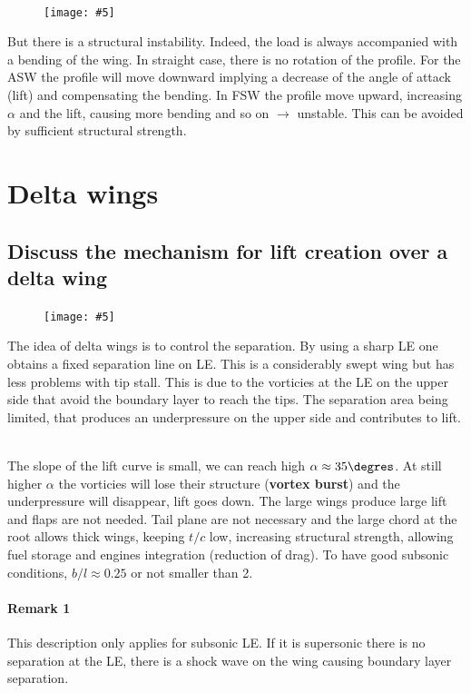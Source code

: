 \documentclass[british,french,11pt, a4paper, openany]{article}
\newcommand{\wrapfig}[6]{%
	\begin{figure}%
		\vspace{-5mm}%
		\texttt{[image: \#5]}%
		\captionof{figure}{}%
		\label{#6}%
	\end{figure}%
}
\begin{document}
\ \\

\wrapfig{6}{r}{5}{0.1}{ch7/15}{ch7/15} 
But there is a structural instability. Indeed, the load is always accompanied with a bending of the wing. In straight case, there is no rotation of the profile. For the ASW the profile will move downward implying a decrease of the angle of attack (lift) and compensating the bending. In FSW the profile move upward, increasing $\alpha$ and the lift, causing more bending and so on $\rightarrow$ unstable. This can be avoided by sufficient structural strength.



\section{Delta wings}
\subsection{Discuss the mechanism for lift creation over a delta wing}
\wrapfig{9}{l}{5}{0.15}{ch7/21}{ch7/21}
The idea of delta wings is to control the separation. By using a sharp LE one obtains a fixed separation line on LE. This is a considerably swept wing but has less problems with tip stall. This is due to the vorticies at the LE on the upper side that avoid the boundary layer to reach the tips. The separation area being limited, that produces an underpressure on the upper side and contributes to lift. 

\ \\
The slope of the lift curve is small, we can reach high $\alpha \approx 35\degres$. At still higher $\alpha$ the vorticies will lose their structure (\textbf{vortex burst}) and the underpressure will disappear, lift goes down. The large wings produce large lift and flaps are not needed. Tail plane are not necessary and the large chord at the root allows thick wings, keeping $t/c$ low, increasing structural strength, allowing fuel storage and engines integration (reduction of drag). To have good subsonic conditions, $b/l \approx 0.25$ or not smaller than 2.

\paragraph{Remark 1}
This description only applies for subsonic LE. If it is supersonic there is no separation at the LE, there is a shock wave on the wing causing boundary layer separation.  
\end{document}

